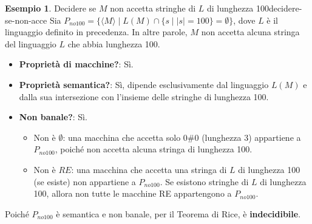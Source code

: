 \documentclass[a4paper]{article}
\theoremstyle{definition} %
\newtheorem{example}[theorem]{Esempio}
\begin{document}
\begin{example}{Decidere se $M$ non accetta stringhe di $L$ di lunghezza 100}{decidere-se-non-acce}
Sia $P_{no100} = \{\langle M \rangle \mid L(M) \cap \{s \mid |s|=100\} = \emptyset\}$, dove $L$ è il linguaggio definito in precedenza. In altre parole, $M$ non accetta alcuna stringa del linguaggio $L$ che abbia lunghezza 100.
\begin{itemize}
    \item \textbf{Proprietà di macchine?}: Sì.
    \item \textbf{Proprietà semantica?}: Sì, dipende esclusivamente dal linguaggio $L(M)$ e dalla sua intersezione con l'insieme delle stringhe di lunghezza 100.
    \item \textbf{Non banale?}: Sì.
    \begin{itemize}
        \item Non è $\emptyset$: una macchina che accetta solo $0\#0$ (lunghezza 3) appartiene a $P_{no100}$, poiché non accetta alcuna stringa di lunghezza 100.
        \item Non è $RE$: una macchina che accetta una stringa di $L$ di lunghezza 100 (se esiste) non appartiene a $P_{no100}$. Se esistono stringhe di $L$ di lunghezza 100, allora non tutte le macchine RE appartengono a $P_{no100}$.
    \end{itemize}
\end{itemize}
Poiché $P_{no100}$ è semantica e non banale, per il Teorema di Rice, è \textbf{indecidibile}.
\end{example}
\end{document}
